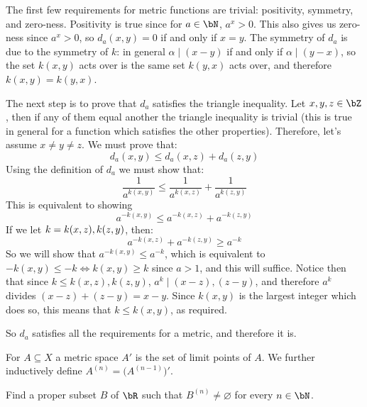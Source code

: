 \documentclass[10pt]{article}
\let\divides=\mid
\begin{document}
\begin{blankpp}

    The first few requirements for metric functions are trivial: positivity, symmetry, and zero-ness.
    Positivity is true since for $a\in\bN$, $a^x>0$.
    This also gives us zero-ness since $a^x>0$, so $d_a(x,y)=0$ if and only if $x=y$.
    The symmetry of $d_a$ is due to the symmetry of $k$: in general $\alpha\divides(x-y)$ if and only if $\alpha\divides(y-x)$, so the set $k(x,y)$ acts over is the same
    set $k(y,x)$ acts over, and therefore $k(x,y)=k(y,x)$.

    The next step is to prove that $d_a$ satisfies the triangle inequality.
    Let $x,y,z\in\bZ$, then if any of them equal another the triangle inequality is trivial (this is true in general for a function which satisfies the other properties).
    Therefore, let's assume $x\neq y\neq z$.
    We must prove that:
        \[ d_a(x,y) \leq d_a(x,z) + d_a(z,y) \]
    Using the definition of $d_a$ we must show that:
        \[ \frac1{a^{k(x,y)}} \leq \frac1{a^{k(x,z)}} + \frac1{a^{k(z,y)}} \]
    This is equivalent to showing
        \[ a^{-k(x,y)} \leq a^{-k(x,z)} + a^{-k(z,y)} \]
    If we let $k=\minof{k(x,z), k(z,y)}$, then:
        \[ a^{-k(x,z)} + a^{-k(z,y)} \geq a^{-k} \]
    So we will show that $a^{-k(x,y)}\leq a^{-k}$, which is equivalent to $-k(x,y)\leq -k\iff k(x,y)\geq k$ since $a>1$, and this will suffice.
    Notice then that since $k\leq k(x,z), k(z,y)$, $a^k\divides (x-z), (z-y)$, and therefore $a^k$ divides $(x-z)+(z-y)=x-y$.
    Since $k(x,y)$ is the largest integer which does so, this means that $k\leq k(x,y)$, as required.

    So $d_a$ satisfies all the requirements for a metric, and therefore it is.
    
\end{blankpp}

\begin{exercise*}

    For $A\subseteq X$ a metric space $A'$ is the set of limit points of $A$.
    We further inductively define $A^{(n)} = \big(A^{(n-1)}\big)'$.


    Find a proper subset $B$ of $\bR$ such that $B^{(n)}\neq\varnothing$ for every $n\in\bN$.

\end{exercise*}
\end{document}
